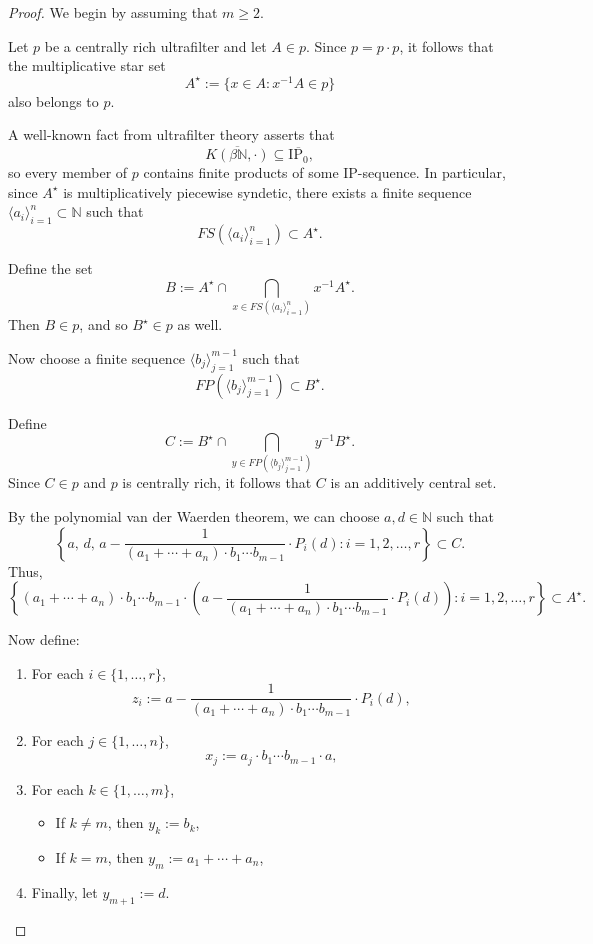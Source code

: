 \documentclass{article}
\theoremstyle{Theorem}
\theoremstyle{definition}
\begin{document}
   \begin{proof}
We begin by assuming that \( m \geq 2 \).

Let \( p \) be a centrally rich ultrafilter and let \( A \in p \). Since \( p = p \cdot p \), it follows that the multiplicative star set
\[
A^\star := \{x \in A : x^{-1}A \in p\}
\]
also belongs to \( p \).

A well-known fact from ultrafilter theory asserts that
\[
\overline{K(\beta \mathbb{N}, \cdot)} \subseteq \overline{\mathrm{IP}_0},
\]
so every member of \( p \) contains finite products of some IP-sequence. In particular, since \( A^\star \) is multiplicatively piecewise syndetic, there exists a finite sequence \( \langle a_i \rangle_{i=1}^n \subset \mathbb{N} \) such that
\[
FS\left(\langle a_i \rangle_{i=1}^n\right) \subset A^\star.
\]

Define the set
\[
B := A^\star \cap \bigcap_{x \in FS\left(\langle a_i \rangle_{i=1}^n\right)} x^{-1}A^\star.
\]
Then \( B \in p \), and so \( B^\star \in p \) as well.

Now choose a finite sequence \( \langle b_j \rangle_{j=1}^{m-1} \) such that
\[
FP\left(\langle b_j \rangle_{j=1}^{m-1}\right) \subset B^\star.
\]

Define
\[
C := B^\star \cap \bigcap_{y \in FP\left(\langle b_j \rangle_{j=1}^{m-1}\right)} y^{-1}B^\star.
\]
Since \( C \in p \) and \( p \) is centrally rich, it follows that \( C \) is an additively central set.

 By the polynomial van der Waerden theorem, we can choose \( a, d \in \mathbb{N} \) such that
\[
\left\{ a,\, d,\, a - \frac{1}{(a_1 + \cdots + a_n) \cdot b_1 \cdots b_{m-1}} \cdot P_i(d) : i = 1, 2, \ldots, r \right\} \subset C.
\]
Thus,
\[
\left\{(a_1 + \cdots + a_n) \cdot b_1 \cdots b_{m-1} \cdot \left( a - \frac{1}{(a_1 + \cdots + a_n) \cdot b_1 \cdots b_{m-1}} \cdot P_i(d) \right) : i = 1, 2, \ldots, r \right\} \subset A^\star.
\]

Now define:
\begin{enumerate}
    \item For each \( i \in \{1, \ldots, r\} \),
    \[
    z_i := a - \frac{1}{(a_1 + \cdots + a_n) \cdot b_1 \cdots b_{m-1}} \cdot P_i(d),
    \]
    \item For each \( j \in \{1, \ldots, n\} \),
    \[
    x_j := a_j \cdot b_1 \cdots b_{m-1} \cdot a,
    \]
    \item For each \( k \in \{1, \ldots, m\} \),
    \begin{itemize}
        \item If \( k \neq m \), then \( y_k := b_k \),
        \item If \( k = m \), then \( y_m := a_1 + \cdots + a_n \),
    \end{itemize}
    \item Finally, let \( y_{m+1} := d \).
\end{enumerate}


\end{proof}
\end{document}
